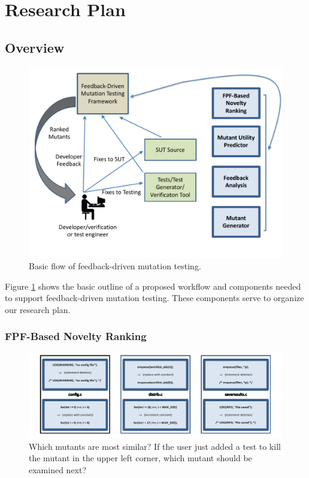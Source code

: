 \section{Research Plan}

\subsection{Overview}

\begin{figure}[t]
\centering
\includegraphics[width=0.8\columnwidth]{TestFlow}

\caption{Basic flow of feedback-driven mutation testing.}
\label{fig:flow}
\end{figure}

Figure \ref{fig:flow} shows the basic outline of a proposed workflow
and components needed to support feedback-driven mutation testing.
These components serve to organize our research plan.


\subsubsection{FPF-Based Novelty Ranking}
\label{sec:fpfplan}

\begin{figure}[t]
\centering
\includegraphics[width=0.95\columnwidth]{distmetric}

\caption{Which mutants are most similar?  If the user just added a
  test to kill the mutant in the upper left corner, which mutant
  should be examined next?}
\label{fig:distances}
\end{figure}

